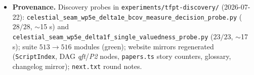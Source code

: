 \begin{itemize}[leftmargin=1.5em]
$J$-weighted closures stay Python-only, flagged in the \texttt{.wl} comment; combined engine
run with the v521/v522 mirrors: extension $522\to540$ (verified, Wolfram Engine 14.3;
\texttt{GATE.WOLFRAM.02}, Wolfram README, \texttt{tfpt\_safeguards}, website counters and
\texttt{zenodo\_description.html} synced $116/116+540/540$).
\item \textbf{Provenance.} Discovery probes in \texttt{experiments/tfpt-discovery/}
(2026-07-22):
\texttt{celestial\_seam\_}\allowbreak\texttt{wp5e\_delta1e\_}\allowbreak\texttt{bcov\_measure\_}\allowbreak\texttt{decision\_probe.py}
($28/28$, $\sim$15 s)
and \texttt{celestial\_seam\_}\allowbreak\texttt{wp5e\_delta1f\_}\allowbreak\texttt{single\_valuedness\_probe.py}
($23/23$, $\sim$17 s); suite $513\to516$ modules (green);
website mirrors regenerated (\texttt{ScriptIndex}, DAG \emph{qft}/\emph{P2} nodes,
\texttt{papers.ts} story counters, glossary, changelog mirror); \texttt{next.txt} round notes.
\end{itemize}

